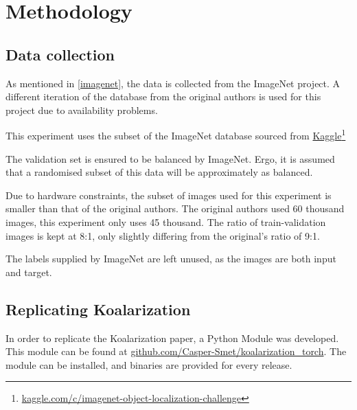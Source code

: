 \documentclass{article}
\begin{document}
\section{Methodology}
    
    \subsection{Data collection} \label{data_col}
        As mentioned in \ref{imagenet}, the data is collected from the ImageNet project. A different iteration of the database from the original authors is used for this project due to availability problems.
        
        This experiment uses the subset of the ImageNet database sourced from \href{https://www.kaggle.com/c/imagenet-object-localization-challenge/overview/description}{Kaggle}\footnote{\href{https://www.kaggle.com/c/imagenet-object-localization-challenge/overview/description}{kaggle.com/c/imagenet-object-localization-challenge}}
        
        The validation set is ensured to be balanced by ImageNet. Ergo, it is assumed that a randomised subset of this data will be approximately as balanced.
        
        Due to hardware constraints, the subset of images used for this experiment is smaller than that of the original authors. The original authors used 60 thousand images, this experiment only uses 45 thousand. The ratio of train-validation images is kept at 8:1, only slightly differing from the original's ratio of 9:1.
        
        The labels supplied by ImageNet are left unused, as the images are both input and target.
        
    
    \subsection{Replicating Koalarization}
        In order to replicate the Koalarization paper, a Python Module was developed. This module can be found at \href{https://github.com/Casper-Smet/koalarization\_torch}{github.com/Casper-Smet/koalarization\_torch}. The module can be installed, and binaries are provided for every release. 
        
\end{document}
